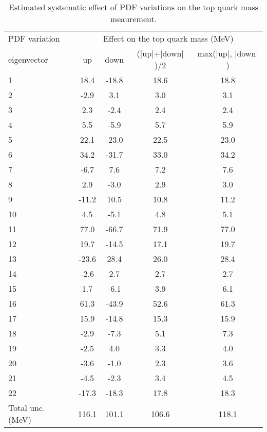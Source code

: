 \begin{table}[tb]
  \begin{center}
    \medskip
    \begin{tabular}{|l|cccc|}
      \toprule
      PDF variation              & \multicolumn{4}{c|}{Effect on the top quark mass (MeV)} \\ 
      \cline{2-5}
       eigenvector & up & down & ($|$up$|$+$|$down$|$)/2 & max($|$up$|$, $|$down$|$) \\
      \midrule
		1 & 18.4 & -18.8 & 18.6 & 18.8 \\
		2 & -2.9 & 3.1 & 3.0 & 3.1 \\ 
		3 & 2.3 & -2.4 & 2.4 & 2.4 \\ 
		4 & 5.5 & -5.9 & 5.7 & 5.9 \\ 
		5 & 22.1 & -23.0 & 22.5 & 23.0 \\ 
		6 & 34.2 & -31.7 & 33.0 & 34.2 \\ 
		7 & -6.7 & 7.6 & 7.2 & 7.6 \\ 
		8 & 2.9 & -3.0 & 2.9 & 3.0 \\ 
		9 & -11.2 & 10.5 & 10.8 & 11.2 \\ 
		10 & 4.5 & -5.1 & 4.8 & 5.1 \\ 
		11 & 77.0 & -66.7 & 71.9 & 77.0 \\ 
		12 & 19.7 & -14.5 & 17.1 & 19.7 \\ 
		13 & -23.6 & 28.4 & 26.0 & 28.4 \\ 
		14 & -2.6 & 2.7 & 2.7 & 2.7 \\ 
		15 & 1.7 & -6.1 & 3.9 & 6.1 \\ 
		16 & 61.3 & -43.9 & 52.6 & 61.3 \\ 
		17 & 15.9 & -14.8 & 15.3 & 15.9 \\ 
		18 & -2.9 & -7.3 & 5.1 & 7.3 \\ 
		19 & -2.5 & 4.0 & 3.3 & 4.0 \\ 
		20 & -3.6 & -1.0 & 2.3 & 3.6 \\ 
		21 & -4.5 & -2.3 & 3.4 & 4.5 \\ 
		22 & -17.3 & -18.3 & 17.8 & 18.3 \\ 
      \midrule
      Total unc. (MeV)  & 116.1 & 101.1 & 106.6 & 118.1 \\
      \bottomrule
    \end{tabular}
    \caption{Estimated systematic effect of PDF variations on the top quark mass meaurement.\label{tab:pdfs}}
  \end{center}
\end{table}  